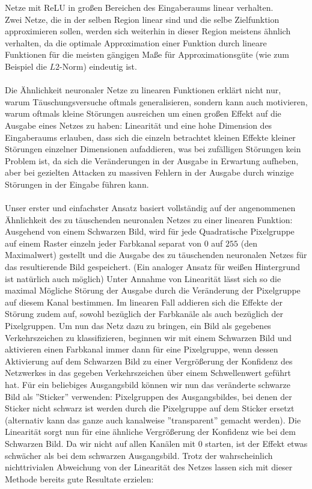 \documentclass[11pt]{article} %
\begin{document}
Netze mit ReLU in großen Bereichen des Eingaberaums linear verhalten. \\ Zwei Netze, die in der selben Region linear sind und die selbe Zielfunktion approximieren sollen, werden sich weiterhin in dieser Region meistens ähnlich verhalten, da die optimale Approximation einer Funktion durch lineare Funktionen für die meisten gängigen Maße für Approximationsgüte (wie zum Beispiel die $L2$-Norm) eindeutig ist. \\ \\ Die Ähnlichkeit neuronaler Netze zu linearen Funktionen erklärt nicht nur, warum Täuschungsversuche oftmals generalisieren, sondern kann auch motivieren, warum oftmals kleine Störungen ausreichen um einen großen Effekt auf die Ausgabe eines Netzes zu haben: Linearität und eine hohe Dimension des Eingaberaums erlauben, dass sich die einzeln betrachtet kleinen Effekte kleiner Störungen einzelner Dimensionen aufaddieren, was bei zufälligen Störungen kein Problem ist, da sich die Veränderungen in der Ausgabe in Erwartung aufheben, aber bei gezielten Attacken zu massiven Fehlern in der Ausgabe durch winzige Störungen in der Eingabe führen kann.  \\ \\
Unser erster und einfachster Ansatz basiert vollständig auf der angenommenen Ähnlichkeit des zu täuschenden neuronalen Netzes zu einer linearen Funktion: Ausgehend von einem Schwarzen Bild, wird für jede Quadratische Pixelgruppe auf einem Raster einzeln jeder Farbkanal separat von $0$ auf $255$ (den Maximalwert) gestellt und die Ausgabe des zu täuschenden neuronalen Netzes für das resultierende Bild gespeichert. (Ein analoger Ansatz für weißen Hintergrund ist natürlich auch möglich) Unter Annahme von Linearität lässt sich so die maximal Mögliche Störung der Ausgabe durch die Veränderung der Pixelgruppe auf diesem Kanal bestimmen. Im linearen Fall addieren sich die Effekte der Störung zudem auf, sowohl bezüglich der Farbkanäle als auch bezüglich der Pixelgruppen. Um nun das Netz dazu zu bringen, ein Bild als gegebenes Verkehrszeichen zu klassifizieren, beginnen wir mit einem Schwarzen Bild und aktivieren einen Farbkanal immer dann für eine Pixelgruppe, wenn dessen Aktivierung auf dem Schwarzen Bild zu einer Vergrößerung der Konfidenz des Netzwerkes in das gegeben Verkehrszeichen über einem Schwellenwert geführt hat. Für ein beliebiges Ausgangsbild  können wir nun das veränderte schwarze Bild als ''Sticker'' verwenden: Pixelgruppen des Ausgangsbildes, bei denen der Sticker nicht schwarz ist werden durch die Pixelgruppe auf dem Sticker ersetzt (alternativ kann das ganze auch kanalweise ''transparent'' gemacht werden). Die Linearität sorgt nun für eine ähnliche Vergrößerung der Konfidenz wie bei dem Schwarzen Bild. Da wir nicht auf allen Kanälen mit 0 starten, ist der Effekt etwas schwächer als bei dem schwarzen Ausgangsbild. Trotz der wahrscheinlich nichttrivialen Abweichung von der Linearität des Netzes lassen sich mit dieser Methode bereits gute Resultate erzielen: \\
\end{document}
